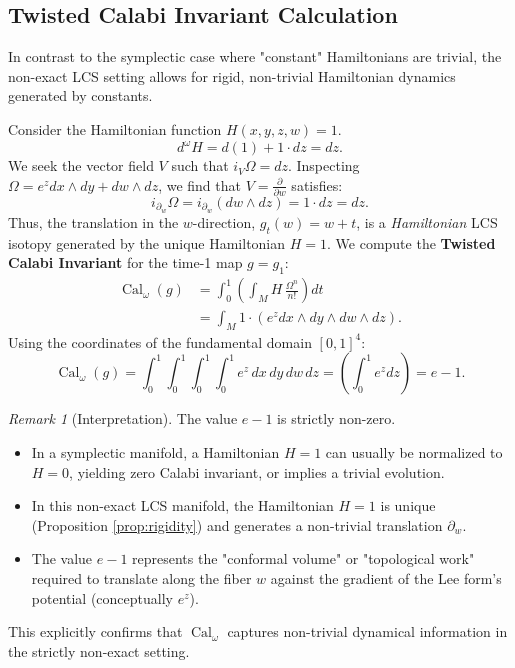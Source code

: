 \documentclass[11pt,a4paper]{amsart}
\theoremstyle{definition}
\theoremstyle{remark}
\newtheorem{remark}[theorem]{Remark}
\newcommand{\Cal}{\operatorname{Cal}}
\begin{document}
	\subsection{Twisted Calabi Invariant Calculation}
	
	In contrast to the symplectic case where "constant" Hamiltonians are trivial, the non-exact LCS setting allows for rigid, non-trivial Hamiltonian dynamics generated by constants.
	
	Consider the Hamiltonian function $H(x,y,z,w) = 1$.
	\[
	d^\omega H = d(1) + 1 \cdot dz = dz.
	\]
	We seek the vector field $V$ such that $i_V \Omega = dz$. Inspecting $\Omega = e^z dx \wedge dy + dw \wedge dz$, we find that $V = \frac{\partial}{\partial w}$ satisfies:
	\[
	i_{\partial_w} \Omega = i_{\partial_w}(dw \wedge dz) = 1 \cdot dz = dz.
	\]
	Thus, the translation in the $w$-direction, $g_t(w) = w+t$, is a \emph{Hamiltonian} LCS isotopy generated by the unique Hamiltonian $H=1$.	We compute the \textbf{Twisted Calabi Invariant} for the time-1 map $g = g_1$:
	\begin{align*}
		\Cal_\omega(g) &= \int_0^1 \left( \int_M H \, \frac{\Omega^n}{n!} \right) dt \\
		&= \int_M 1 \cdot (e^z dx \wedge dy \wedge dw \wedge dz).
	\end{align*}
	Using the coordinates of the fundamental domain $[0,1]^4$:
	\[
	\Cal_\omega(g) = \int_0^1 \int_0^1 \int_0^1 \int_0^1 e^z \, dx \, dy \, dw \, dz = \left(\int_0^1 e^z dz\right) = e - 1.
	\]
	
	\begin{remark}[Interpretation]
		The value $e-1$ is strictly non-zero.
		\begin{itemize}
			\item In a symplectic manifold, a Hamiltonian $H=1$ can usually be normalized to $H=0$, yielding zero Calabi invariant, or implies a trivial evolution.
			\item In this non-exact LCS manifold, the Hamiltonian $H=1$ is unique (Proposition \ref{prop:rigidity}) and generates a non-trivial translation $\partial_w$.
			\item The value $e-1$ represents the "conformal volume" or "topological work" required to translate along the fiber $w$ against the gradient of the Lee form's potential (conceptually $e^z$).
		\end{itemize}
		This explicitly confirms that $\Cal_\omega$ captures non-trivial dynamical information in the strictly non-exact setting.
	\end{remark}
	
\end{document}
